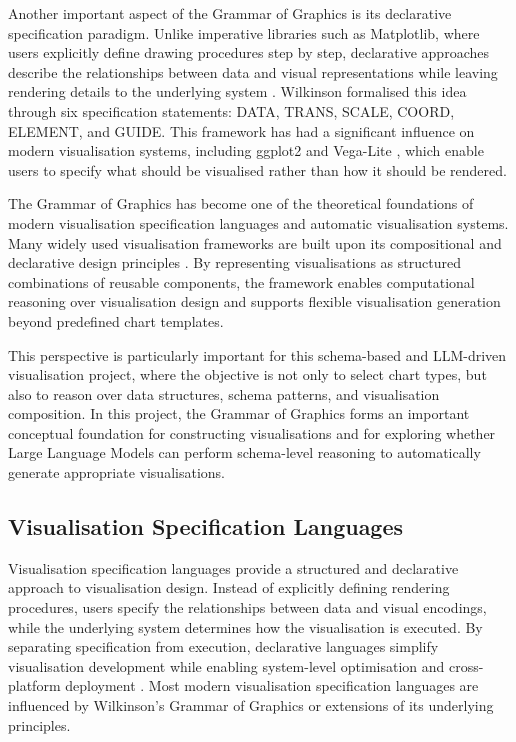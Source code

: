 Another important aspect of the Grammar of Graphics is its declarative specification paradigm. Unlike imperative libraries such as Matplotlib, where users explicitly define drawing procedures step by step, declarative approaches describe the relationships between data and visual representations while leaving rendering details to the underlying system \cite{heer2010declarative}. Wilkinson formalised this idea through six specification statements: DATA, TRANS, SCALE, COORD, ELEMENT, and GUIDE. This framework has had a significant influence on modern visualisation systems, including ggplot2 \cite{wickham2011ggplot2, wickham2016ggplot2} and Vega-Lite \cite{satyanarayan2016vega}, which enable users to specify what should be visualised rather than how it should be rendered.

The Grammar of Graphics has become one of the theoretical foundations of modern visualisation specification languages and automatic visualisation systems. Many widely used visualisation frameworks are built upon its compositional and declarative design principles \cite{heer2010declarative}. By representing visualisations as structured combinations of reusable components, the framework enables computational reasoning over visualisation design and supports flexible visualisation generation beyond predefined chart templates.

This perspective is particularly important for this schema-based and LLM-driven visualisation project, where the objective is not only to select chart types, but also to reason over data structures, schema patterns, and visualisation composition. In this project, the Grammar of Graphics forms an important conceptual foundation for constructing visualisations and for exploring whether Large Language Models can perform schema-level reasoning to automatically generate appropriate visualisations.

\subsection{Visualisation Specification Languages}
Visualisation specification languages provide a structured and declarative approach to visualisation design. Instead of explicitly defining rendering procedures, users specify the relationships between data and visual encodings, while the underlying system determines how the visualisation is executed. By separating specification from execution, declarative languages simplify visualisation development while enabling system-level optimisation and cross-platform deployment \cite{heer2010declarative}. Most modern visualisation specification languages are influenced by Wilkinson’s Grammar of Graphics \cite{wilkinson2005grammar} or extensions of its underlying principles.

